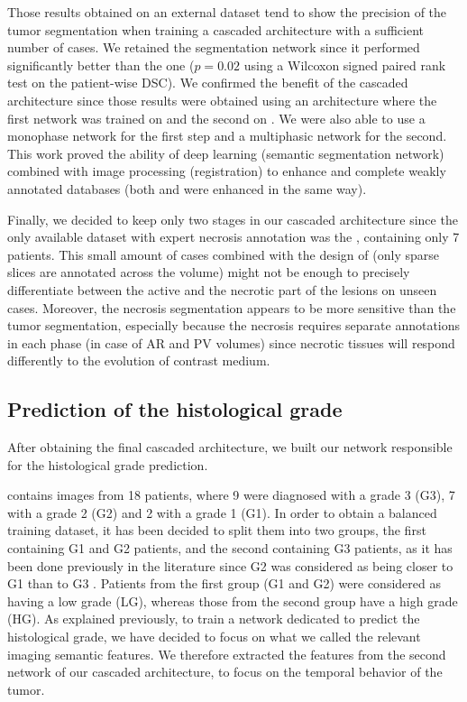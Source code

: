 Those results obtained on an external dataset tend to show the precision
of the tumor segmentation when training a cascaded architecture with a
sufficient number of cases.
We retained the  segmentation network since it performed
significantly better than the  one ($ p = 0.02 $ using a Wilcoxon signed
paired rank test on the patient-wise DSC).
We confirmed the benefit of the cascaded architecture since those results
were obtained using an architecture where the first network was trained
on  and the second on . We were also able to use
a monophase network for the first step and a multiphasic network for the
second.
This work proved the ability of deep learning (semantic segmentation
network) combined with image processing (registration) to enhance and
complete weakly annotated databases (both  and  were
enhanced in the same way).

Finally, we decided to keep only two stages in our cascaded architecture
since the only available dataset with expert necrosis annotation was the
, containing only 7 patients. This small amount of cases
combined with the design of  (only sparse slices are
annotated across the volume) might not be enough to precisely
differentiate between the active and the necrotic part of the lesions on
unseen cases. Moreover, the necrosis segmentation appears to be more
sensitive than the tumor segmentation, especially because the necrosis
requires separate annotations in each phase (in case of AR and PV volumes) since necrotic tissues will respond differently to the evolution of contrast medium.

\subsection{Prediction of the histological grade}\label{prediction-of-the-histological-grade-on-tcia-db}

After obtaining the final cascaded architecture, we built our network responsible for the
histological grade prediction.

 contains images from 18 patients, where 9 were diagnosed with a
grade 3 (G3), 7 with a grade 2 (G2) and 2 with a grade 1 (G1). In order
to obtain a balanced training dataset, it has been decided to split them
into two groups, the first containing G1 and G2 patients, and the second containing G3 patients, as it has been done previously in the literature since G2
was considered as being closer to G1 than to G3 \cite{Han2013,Zucman-Rossi2015}. Patients from the first group (G1 and G2) were considered as
having a low grade (LG), whereas those from the second group have a high
grade (HG).
As explained previously, to train a network dedicated to predict the
histological grade, we have decided to focus on what we called the
relevant imaging semantic features.
We therefore extracted the features from the second network of our
cascaded architecture, to focus on the temporal behavior of the tumor.

